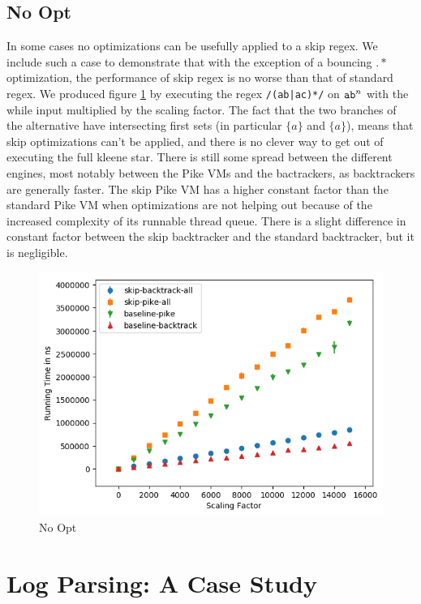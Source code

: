 \subsection{No Opt}

In some cases no optimizations can be usefully applied to a skip
regex. We include such a case to demonstrate that with the exception
of a bouncing $.*$ optimization, the performance of skip regex is
no worse than that of standard regex. We produced figure 
\ref{fig:justtwo:branch}
by executing the regex \verb'/(ab|ac)*/' on ${\tt ab}^n$ with
the while input multiplied by the scaling factor. The fact that the
two branches of the alternative have intersecting first sets
(in particular $\{a\}$ and $\{a\}$), means that skip optimizations
can't be applied, and there is no clever way to get out of
executing the full kleene star. There is still some spread between
the different engines, most notably between the Pike VMs and the
bactrackers, as backtrackers are generally faster. The skip Pike VM
has a higher constant factor than the standard Pike VM when optimizations
are not helping out because of the increased complexity of its runnable
thread queue. There is a slight difference in constant factor between
the skip backtracker and the standard backtracker, but it is negligible.

\begin{figure}
\caption{No Opt}
\label{fig:justtwo:branch}

\includegraphics{resources/no-opt.png}
\end{figure}

\section{Log Parsing: A Case Study}
\label{section:logparsingcase}

